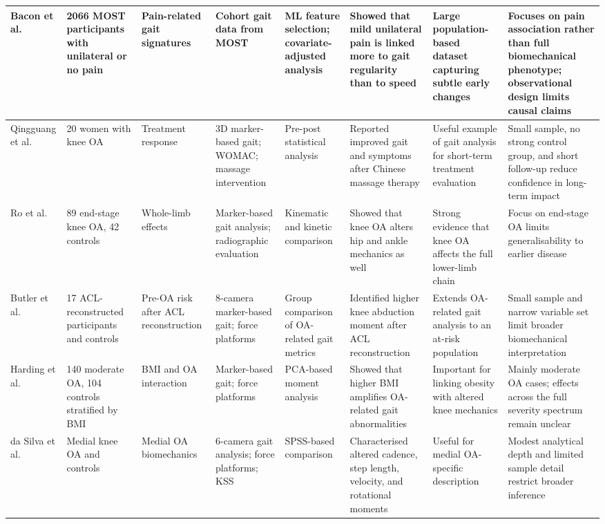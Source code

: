\documentclass[12pt]{elsarticle}
\begin{document}
{\begin{longtable}{p{1.9cm} p{1.6cm} p{1.9cm} p{1.9cm} p{1.7cm} p{1.9cm} p{2.0cm} p{3.0cm}}
Bacon et al. \cite{bacon2022relation}
& 2066 MOST participants with unilateral or no pain
& Pain-related gait signatures
& Cohort gait data from MOST
& ML feature selection; covariate-adjusted analysis
& Showed that mild unilateral pain is linked more to gait regularity than to speed
& Large population-based dataset capturing subtle early changes
& Focuses on pain association rather than full biomechanical phenotype; observational design limits causal claims \\
\hline

Qingguang et al. \cite{qingguang2015gait}
& 20 women with knee OA
& Treatment response
& 3D marker-based gait; WOMAC; massage intervention
& Pre-post statistical analysis
& Reported improved gait and symptoms after Chinese massage therapy
& Useful example of gait analysis for short-term treatment evaluation
& Small sample, no strong control group, and short follow-up reduce confidence in long-term impact \\
\hline

Ro et al. \cite{ro2019effects}
& 89 end-stage knee OA, 42 controls
& Whole-limb effects
& Marker-based gait analysis; radiographic evaluation
& Kinematic and kinetic comparison
& Showed that knee OA alters hip and ankle mechanics as well
& Strong evidence that knee OA affects the full lower-limb chain
& Focus on end-stage OA limits generalisability to earlier disease \\
\hline

Butler et al. \cite{butler2009gait}
& 17 ACL-reconstructed participants and controls
& Pre-OA risk after ACL reconstruction
& 8-camera marker-based gait; force platforms
& Group comparison of OA-related gait metrics
& Identified higher knee abduction moment after ACL reconstruction
& Extends OA-related gait analysis to an at-risk population
& Small sample and narrow variable set limit broader biomechanical interpretation \\
\hline

Harding et al. \cite{harding2012body}
& 140 moderate OA, 104 controls stratified by BMI
& BMI and OA interaction
& Marker-based gait; force platforms
& PCA-based moment analysis
& Showed that higher BMI amplifies OA-related gait abnormalities
& Important for linking obesity with altered knee mechanics
& Mainly moderate OA cases; effects across the full severity spectrum remain unclear \\
\hline

da Silva et al. \cite{da2012biomechanical}
& Medial knee OA and controls
& Medial OA biomechanics
& 6-camera gait analysis; force platforms; KSS
& SPSS-based comparison
& Characterised altered cadence, step length, velocity, and rotational moments
& Useful for medial OA-specific description
& Modest analytical depth and limited sample detail restrict broader inference \\
\hline


\end{longtable}}
\end{document}
